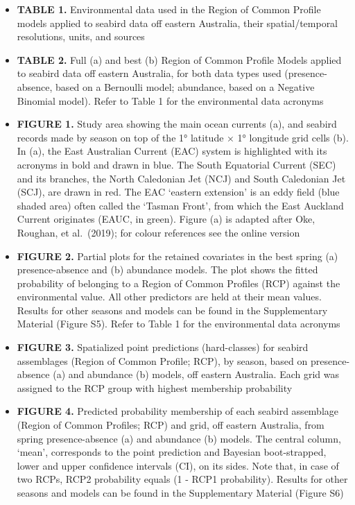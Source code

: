 \documentclass{article}
\providecommand{\tightlist}{%
  \setlength{\itemsep}{0pt}\setlength{\parskip}{0pt}}
\begin{document}
\begin{linenumbers}
\begin{itemize}
\tightlist
\item
  \textbf{TABLE 1.} Environmental data used in the Region of Common Profile models applied to seabird data off eastern Australia, their spatial/temporal resolutions, units, and sources
\item
  \textbf{TABLE 2.} Full (a) and best (b) Region of Common Profile Models applied to seabird data off eastern Australia, for both data types used (presence-absence, based on a Bernoulli model; abundance, based on a Negative Binomial model). Refer to Table 1 for the environmental data acronyms
\item
  \textbf{FIGURE 1.} Study area showing the main ocean currents (a), and seabird records made by season on top of the 1° latitude × 1° longitude grid cells (b). In (a), the East Australian Current (EAC) system is highlighted with its acronyms in bold and drawn in blue. The South Equatorial Current (SEC) and its branches, the North Caledonian Jet (NCJ) and South Caledonian Jet (SCJ), are drawn in red. The EAC `eastern extension' is an eddy field (blue shaded area) often called the `Tasman Front', from which the East Auckland Current originates (EAUC, in green). Figure (a) is adapted after Oke, Roughan, et al.~(2019); for colour references see the online version
\item
  \textbf{FIGURE 2.} Partial plots for the retained covariates in the best spring (a) presence-absence and (b) abundance models. The plot shows the fitted probability of belonging to a Region of Common Profiles (RCP) against the environmental value. All other predictors are held at their mean values. Results for other seasons and models can be found in the Supplementary Material (Figure S5). Refer to Table 1 for the environmental data acronyms
\item
  \textbf{FIGURE 3.} Spatialized point predictions (hard-classes) for seabird assemblages (Region of Common Profile; RCP), by season, based on presence-absence (a) and abundance (b) models, off eastern Australia. Each grid was assigned to the RCP group with highest membership probability
\item
  \textbf{FIGURE 4.} Predicted probability membership of each seabird assemblage (Region of Common Profiles; RCP) and grid, off eastern Australia, from spring presence-absence (a) and abundance (b) models. The central column, `mean', corresponds to the point prediction and Bayesian boot-strapped, lower and upper confidence intervals (CI), on its sides. Note that, in case of two RCPs, RCP2 probability equals (1 - RCP1 probability). Results for other seasons and models can be found in the Supplementary Material (Figure S6)

\end{itemize}
\end{linenumbers}
\end{document}

